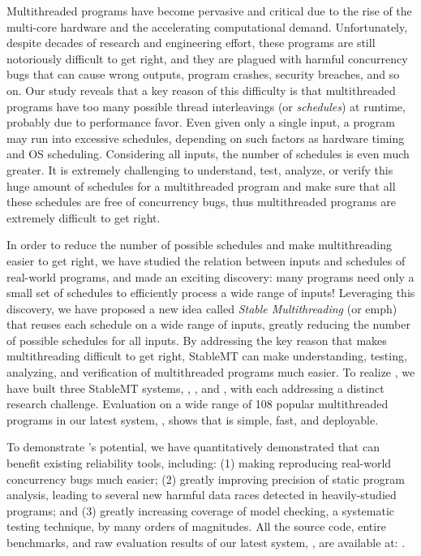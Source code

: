 Multithreaded programs have become pervasive and critical due to the rise of the
multi-core hardware and the accelerating computational demand.
Unfortunately, despite decades of research and engineering effort, these
programs are still notoriously difficult to get right, and they are plagued with
harmful concurrency bugs that can cause wrong outputs, program crashes, security
breaches, and so on. Our study reveals that a key reason of this difficulty is
that multithreaded programs have too many possible thread interleavings (or
\emph{schedules}) at runtime, probably due to performance favor. Even given only a
single input, a program may run into excessive schedules, depending on such
factors as hardware timing and OS scheduling. Considering all inputs, the number
of schedules is even much greater. It is extremely challenging to understand,
test, analyze, or verify this huge amount of schedules for a
multithreaded program and make sure that all these schedules are free of concurrency
bugs, thus multithreaded programs are extremely difficult to get right.

In order to reduce the number of possible schedules and make multithreading
easier to get right, we have studied the
relation between inputs and schedules of real-world programs, and made an
exciting discovery: many programs need only a small set of schedules to
efficiently process a wide range of inputs! Leveraging this discovery, we have
proposed a new idea called \emph{Stable Multithreading} (or emph{\smt}) that reuses each
schedule on a wide range of inputs, greatly reducing the number of possible
schedules for all inputs. By addressing the key reason that makes multithreading
difficult to get right, StableMT can make understanding,
testing, analyzing, and verification of multithreaded programs much
easier. To realize \smt, we have built three StableMT systems, \tern,
\peregrine, and \parrot, with each addressing a distinct research challenge.
Evaluation on a wide range of 108 popular multithreaded programs in
our latest \smt system, \parrot, shows that \smt is simple, fast, and
deployable.

To demonstrate \smt's potential, we have quantitatively demonstrated that \smt 
can benefit existing reliability tools, including: (1) making reproducing
real-world concurrency bugs much easier;  (2) greatly improving precision of
static program analysis, leading to several new harmful data races detected in
heavily-studied programs; and (3) greatly increasing coverage of model checking,
a systematic testing technique, by many orders of magnitudes. All the source
code, entire benchmarks, and raw evaluation results of our latest \smt system,
\parrot, are available at: \github.

